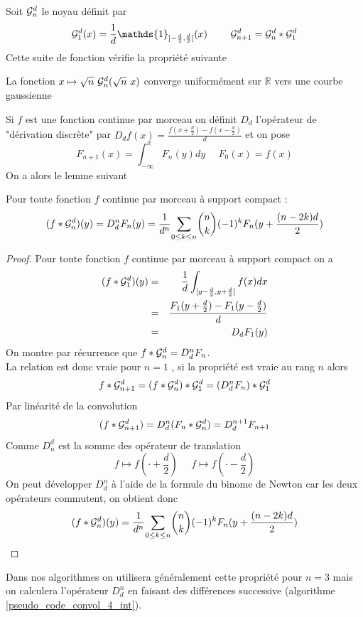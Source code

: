 Soit $\mathcal{G}_n^d$ le noyau définit par 
\begin{equation*}
\Gcal_1^d(x)=\frac{1}{d}\mathds{1}_{]-\frac{d}{2},\frac{d}{2}[}(x) ~~~~~~~\Gcal_{n+1}^d= \Gcal_n^d * \Gcal_1^d 
\label{formule_convol_n_int}
\end{equation*}
Cette suite de fonction vérifie la propriété suivante
\begin{prop}
La fonction $x\mapsto \sqrt{n}~\mathcal{G}_n^d(\sqrt{n}~x)$ converge uniformément sur $\mathbb{R}$ vers une courbe gaussienne 
\end{prop}
Si $f$ est une fonction continue par morceau on définit $D_d$ l'opérateur de "dérivation discrète" par $D_d f(x)=\frac{f(x+\frac{d}{2})-f(x-\frac{d}{2})}{d}$  et on pose
\begin{equation*}
F_{n+1}(x)= \int_{-\infty}^{x}F_{n}(y)dy~~~~~~F_{0}(x)= f(x)
\end{equation*}
On a alors le lemme suivant 
\begin{prop} Pour toute fonction $f$ continue par morceau à support compact :
\begin{equation}
 (f*\mathcal{G}_n^d)(y)=D_d^n F_{n}(y)= \frac{1}{d^n}\underset{0 \le k\le n}{\sum} \binom{n}{k}(-1)^{k} F_{n}(y+\frac{(n-2k)d}{2})
\end{equation}
\end{prop}
\begin{proof}
Pour toute fonction $f$ continue par morceau à support compact on a 
\begin{eqnarray*}
(f * \mathcal{G}_1^d )(y)&=&\frac{1}{d} \int_{[y-\frac{d}{2},y+\frac{d}{2}]} f(x) dx\\
               &=&\frac{F_{1}(y+\frac{d}{2})-F_{1}(y-\frac{d}{2})}{d}\\
               &=&D_d F_{1}(y)
\end{eqnarray*}
On montre par récurrence que $ f*\mathcal{G}_n^d=D_d^n F_{n}$.\\
La relation est donc vraie pour $n=1$ , si la propriété est vraie au rang $n$ alors
\begin{equation*}
f*\mathcal{G}_{n+1}^{d}=(f * \mathcal{G}_{n}^d) * \mathcal{G}_{1}^{d}= (D_d^n F_{n})*\mathcal{G}_1^d 
\end{equation*}
Par linéarité de la convolution
\begin{equation*}
(f*\mathcal{G}_{n+1}^{d})= D_d^n (F_{n}*\mathcal{G}_n^d) = D_d^{n+1} F_{n+1}
\end{equation*}
Comme $D_n^d$ est la somme des opérateur de translation
\begin{equation*}
f\mapsto f(\cdot+\frac{d}{2})~~~~~~f\mapsto f(\cdot-\frac{d}{2})
\end{equation*}
On peut développer $D_d^n$ à l'aide de la formule du binome de Newton car les deux opérateurs commutent, on obtient donc
\begin{equation*}
(f*\mathcal{G}_n^d)(y) = \frac{1}{d^n}\underset{0 \le k\le n}{\sum} \binom{n}{k}(-1)^{k} F_{n}(y+\frac{(n-2k)d}{2})
\end{equation*}

\end{proof}
Dans nos algorithmes  on utilisera généralement cette propriété pour $n=3$ mais on calculera l'opérateur $D_d^n$ en faisant des différences successive (algorithme \ref{pseudo_code_convol_4_int}).\\

